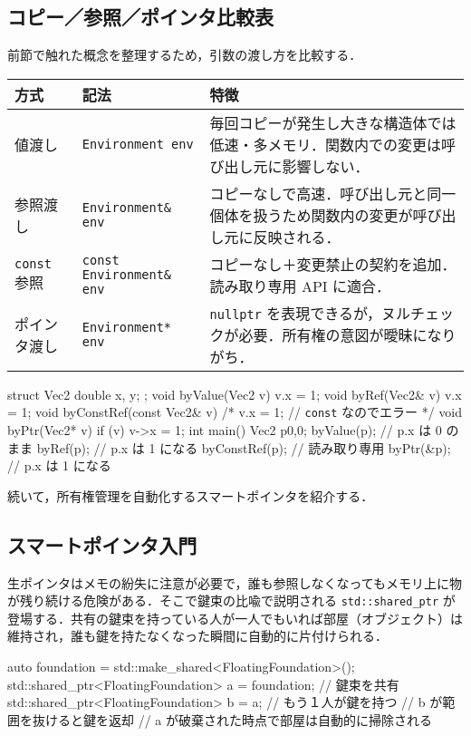 \documentclass[10pt,letterpaper]{jsarticle}
\begin{document}
\subsection{コピー／参照／ポインタ比較表}
前節で触れた概念を整理するため，引数の渡し方を比較する．
\begin{table}[h]
\centering
\begin{tabular}{llp{7.8cm}}
\toprule
方式 & 記法 & 特徴 \\
\midrule
値渡し & \texttt{Environment env} & 毎回コピーが発生し大きな構造体では低速・多メモリ．関数内での変更は呼び出し元に影響しない．\\
参照渡し & \texttt{Environment\& env} & コピーなしで高速．呼び出し元と同一個体を扱うため関数内の変更が呼び出し元に反映される．\\
\texttt{const} 参照 & \texttt{const Environment\& env} & コピーなし＋変更禁止の契約を追加．読み取り専用 API に適合．\\
ポインタ渡し & \texttt{Environment* env} & \texttt{nullptr} を表現できるが，ヌルチェックが必要．所有権の意図が曖昧になりがち．\\
\bottomrule
\end{tabular}
\end{table}

\begin{cppcode}
struct Vec2 { double x, y; };
void byValue(Vec2 v) { v.x = 1; }
void byRef(Vec2& v) { v.x = 1; }
void byConstRef(const Vec2& v) { /* v.x = 1; // \texttt{const} なのでエラー */ }
void byPtr(Vec2* v) { if (v) v->x = 1; }
int main() {
    Vec2 p{0,0};
    byValue(p);     // p.x は 0 のまま
    byRef(p);       // p.x は 1 になる
    byConstRef(p);  // 読み取り専用
    byPtr(&p);      // p.x は 1 になる
}
\end{cppcode}
続いて，所有権管理を自動化するスマートポインタを紹介する．

\subsection{スマートポインタ入門}
生ポインタはメモの紛失に注意が必要で，誰も参照しなくなってもメモリ上に物が残り続ける危険がある．そこで鍵束の比喩で説明される \verb|std::shared_ptr| が登場する．共有の鍵束を持っている人が一人でもいれば部屋（オブジェクト）は維持され，誰も鍵を持たなくなった瞬間に自動的に片付けられる．

\begin{cppcode}[caption={shared\_ptr による共有と自動掃除}]
auto foundation = std::make_shared<FloatingFoundation>();
std::shared_ptr<FloatingFoundation> a = foundation; // 鍵束を共有
{
    std::shared_ptr<FloatingFoundation> b = a; // もう１人が鍵を持つ
} // b が範囲を抜けると鍵を返却
// a が破棄された時点で部屋は自動的に掃除される
\end{cppcode}
\end{document}
